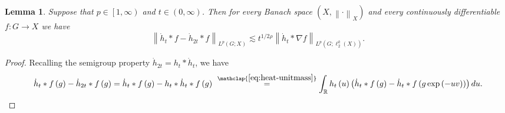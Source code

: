 \documentclass[11pt,reqno]{amsart}
\newtheorem{lemma}[theorem]{Lemma}
\newcommand{\1}{\mathbf 1}
\begin{document}
\begin{lemma}\label{lem:increment}
Suppose that $p\in \left[1,\infty\right)$ and $t\in \left(0,\infty\right)$. Then for every Banach space $\left(X,\left\|\cdot\right\|_X\right)$ and every continuously differentiable $f:G\to X$ we have
\begin{equation}\label{eq:increment}
\left\|\dot{h}_t*f-\dot{h}_{2t}*f \right\|_{L^p\left(G;X\right)}\lesssim t^{1/2\rho}\left\|\dot{h}_t*\nabla f\right\|_{L^p\left(G;\ell_2^k\left(X\right)\right)}.
\end{equation}
\end{lemma}
\begin{proof}
Recalling the semigroup property $\dot{h}_{2t}=h_t*\dot{h}_t$, we have
\begin{equation}\label{eq:use semigroup of root}
\dot{h}_t*f\left(g\right)-\dot{h}_{2t}*f\left(g\right)=\dot{h}_t*f\left(g\right)-h_t*\dot{h}_t*f\left(g\right)~\stackrel{\mathclap{\eqref{eq:heat-unitmass}}}{=}\int_\mathbb{R} h_t\left(u\right)\left(\dot{h}_t*f\left(g\right)-\dot{h}_t*f\left(g\exp\left(-uv\right)\right)\right)du.
\end{equation}


\end{proof}
\end{document}
